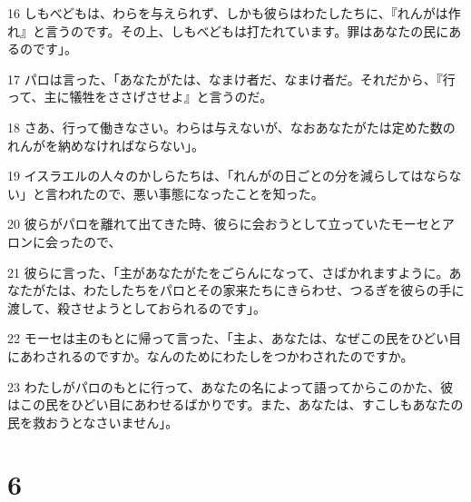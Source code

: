 \par 16 しもべどもは、わらを与えられず、しかも彼らはわたしたちに、『れんがは作れ』と言うのです。その上、しもべどもは打たれています。罪はあなたの民にあるのです」。
\par 17 パロは言った、「あなたがたは、なまけ者だ、なまけ者だ。それだから、『行って、主に犠牲をささげさせよ』と言うのだ。
\par 18 さあ、行って働きなさい。わらは与えないが、なおあなたがたは定めた数のれんがを納めなければならない」。
\par 19 イスラエルの人々のかしらたちは、「れんがの日ごとの分を減らしてはならない」と言われたので、悪い事態になったことを知った。
\par 20 彼らがパロを離れて出てきた時、彼らに会おうとして立っていたモーセとアロンに会ったので、
\par 21 彼らに言った、「主があなたがたをごらんになって、さばかれますように。あなたがたは、わたしたちをパロとその家来たちにきらわせ、つるぎを彼らの手に渡して、殺させようとしておられるのです」。
\par 22 モーセは主のもとに帰って言った、「主よ、あなたは、なぜこの民をひどい目にあわされるのですか。なんのためにわたしをつかわされたのですか。
\par 23 わたしがパロのもとに行って、あなたの名によって語ってからこのかた、彼はこの民をひどい目にあわせるばかりです。また、あなたは、すこしもあなたの民を救おうとなさいません」。

\chapter{6}

